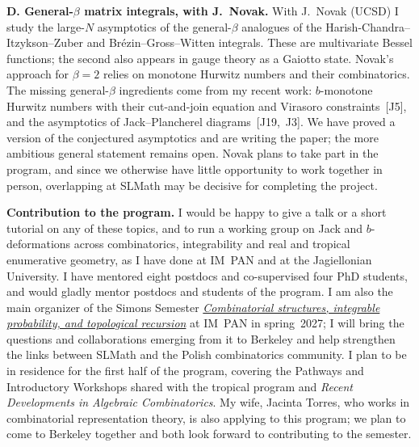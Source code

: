 \documentclass[11pt,a4paper]{amsart}
\newcommand{\proj}[1]{\par\smallskip\noindent\textbf{#1}\;}
\begin{document}
\proj{D. General-$\beta$ matrix integrals, with J.~Novak.}
With J.~Novak (UCSD) I study the large-$N$ asymptotics of the general-$\beta$ analogues of the Harish-Chandra--Itzykson--Zuber and Brézin--Gross--Witten integrals. These are multivariate Bessel functions; the second also appears in gauge theory as a Gaiotto state. Novak's approach for $\beta=2$ relies on monotone Hurwitz numbers and their combinatorics. The missing general-$\beta$ ingredients come from my recent work: $b$-monotone Hurwitz numbers with their cut-and-join equation and Virasoro constraints~[J5], and the asymptotics of Jack--Plancherel diagrams~[J19,~J3]. We have proved a version of the conjectured asymptotics and are writing the paper; the more ambitious general statement remains open. Novak plans to take part in the program, and since we otherwise have little opportunity to work together in person, overlapping at SLMath may be decisive for completing the project.
 
\proj{Contribution to the program.}
I would be happy to give a talk or a short tutorial on any of these topics, and to run a working group on Jack and $b$-deformations across combinatorics, integrability and real and tropical enumerative geometry, as I have done at IM~PAN and at the Jagiellonian University. I have mentored eight postdocs and co-supervised four PhD students, and would gladly mentor postdocs and students of the program. I am also the main organizer of the Simons Semester \href{https://integrable.impan.pl}{\emph{Combinatorial structures, integrable probability, and topological recursion}} at IM~PAN in spring~2027; I will bring the questions and collaborations emerging from it to Berkeley and help strengthen the links between SLMath and the Polish combinatorics community. I plan to be in residence for the first half of the program, covering the Pathways and Introductory Workshops shared with the tropical program and \emph{Recent Developments in Algebraic Combinatorics}. My wife, Jacinta Torres, who works in combinatorial representation theory, is also applying to this program; we plan to come to Berkeley together and both look forward to contributing to the semester.
 
\end{document}
